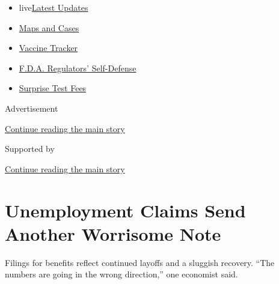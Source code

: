 \begin{itemize}
\tightlist
\item
  live\href{https://www.nytimes3xbfgragh.onion/2020/09/11/world/covid-19-coronavirus.html?name=styln-coronavirus-markets\&region=TOP_BANNER\&block=storyline_menu_recirc\&action=click\&pgtype=Article\&impression_id=6e5788b1-f4c0-11ea-8126-759f148636fd\&variant=undefined}{Latest
  Updates}
\item
  \href{https://www.nytimes3xbfgragh.onion/interactive/2020/us/coronavirus-us-cases.html?name=styln-coronavirus-markets\&region=TOP_BANNER\&block=storyline_menu_recirc\&action=click\&pgtype=Article\&impression_id=6e5788b2-f4c0-11ea-8126-759f148636fd\&variant=undefined}{Maps
  and Cases}
\item
  \href{https://www.nytimes3xbfgragh.onion/interactive/2020/science/coronavirus-vaccine-tracker.html?name=styln-coronavirus-markets\&region=TOP_BANNER\&block=storyline_menu_recirc\&action=click\&pgtype=Article\&impression_id=6e5788b3-f4c0-11ea-8126-759f148636fd\&variant=undefined}{Vaccine
  Tracker}
\item
  \href{https://www.nytimes3xbfgragh.onion/2020/09/10/us/politics/fda-coronavirus-vaccine.html?name=styln-coronavirus-markets\&region=TOP_BANNER\&block=storyline_menu_recirc\&action=click\&pgtype=Article\&impression_id=6e5788b4-f4c0-11ea-8126-759f148636fd\&variant=undefined}{F.D.A.
  Regulators' Self-Defense}
\item
  \href{https://www.nytimes3xbfgragh.onion/2020/09/09/upshot/coronavirus-surprise-test-fees.html?name=styln-coronavirus-markets\&region=TOP_BANNER\&block=storyline_menu_recirc\&action=click\&pgtype=Article\&impression_id=6e5788b5-f4c0-11ea-8126-759f148636fd\&variant=undefined}{Surprise
  Test Fees}
\end{itemize}

Advertisement

\protect\hyperlink{after-top}{Continue reading the main story}

Supported by

\protect\hyperlink{after-sponsor}{Continue reading the main story}

\hypertarget{unemployment-claims-send-another-worrisome-note}{%
\section{Unemployment Claims Send Another Worrisome
Note}\label{unemployment-claims-send-another-worrisome-note}}

Filings for benefits reflect continued layoffs and a sluggish recovery.
``The numbers are going in the wrong direction,'' one economist said.

